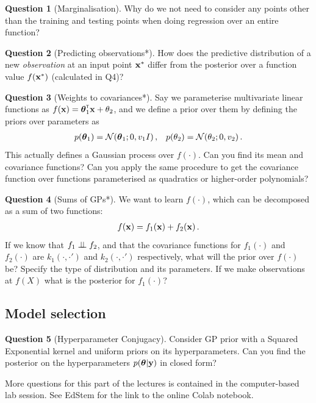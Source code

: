 \documentclass[a4paper]{article}
\theoremstyle{definition}
\newtheorem{question}{Question}
\begin{document}
\begin{question}[Marginalisation]
\label{q:marginalisation}
Why do we not need to consider any points other than the training and testing points when doing regression over an entire function?
\end{question}

\begin{question}[Predicting observations*]
\label{q:pred-obs}
How does the predictive distribution of a new \emph{observation} at an input point $\mathbf{x}^*$ differ from the posterior over a function value $f(\mathbf{x}^*)$ (calculated in Q4)?
\end{question}

\begin{question}[Weights to covariances*]
\label{q:weights}
Say we parameterise multivariate linear functions as $f(\mathbf{x}) = \boldsymbol{\theta}_1^\mathrm{\textsf{\tiny T}}\mathbf{x} + \theta_2$, and we define a prior over them by defining the priors over parameters as
\begin{align}
p(\vtheta_1) = \NormDist{\vtheta_1; 0, v_1 I}\,, && p(\theta_2) = \NormDist{\theta_2; 0, v_2} \,.
\end{align}
This actually defines a Gaussian process over $f(\cdot)$. Can you find its mean and covariance functions? Can you apply the same procedure to get the covariance function over functions parameterised as quadratics or higher-order polynomials?
\end{question}


\begin{question}[Sums of GPs*]
\label{q:gp-sum}
We want to learn $f(\cdot)$, which can be decomposed as a sum of two functions:
\begin{align}
f(\mathbf{x}) = f_1(\mathbf{x}) + f_2(\mathbf{x})\,.
\end{align}
If we know that $f_1 \perp\!\!\!\perp f_2$, and that the covariance functions for $f_1(\cdot)$ and $f_2(\cdot)$ are $k_1(\cdot, \cdot')$ and $k_2(\cdot, \cdot')$ respectively, what will the prior over $f(\cdot)$ be? Specify the type of distribution and its parameters. If we make observations at $f(X)$ what is the posterior for $f_1(\cdot)$?
\end{question}




\subsection{Model selection}
\begin{question}[Hyperparameter Conjugacy]
\label{q:gp-hyper-conj}
Consider GP prior with a Squared Exponential kernel and uniform priors on its hyperparameters. Can you find the posterior on the hyperparameters $p(\boldsymbol{\theta}|\mathbf{y})$ in closed form?
\end{question}
More questions for this part of the lectures is contained in the computer-based lab session. See EdStem for the link to the online Colab notebook.
\end{document}
